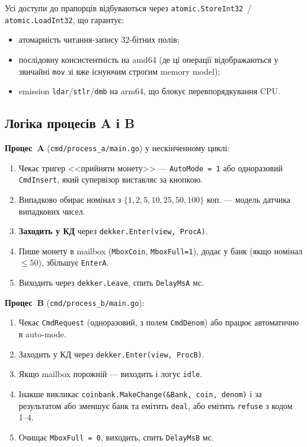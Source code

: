 \documentclass[a4paper,12pt]{article}
\begin{document}
Усі доступи до прапорців відбуваються через
\texttt{atomic.StoreInt32}~/ \texttt{atomic.LoadInt32}, що гарантує:
\begin{itemize}
    \item атомарність читання-запису 32-бітних полів;
    \item послідовну консистентність на amd64 (де ці операції
    відображаються у звичайні \texttt{mov} зі вже існуючим строгим
    memory model);
    \item emission \texttt{ldar}/\texttt{stlr}/\texttt{dmb} на arm64,
    що блокує перевпорядкування CPU.
\end{itemize}

\subsection{Логіка процесів A і B}

\textbf{Процес~A} (\texttt{cmd/process\_a/main.go}) у нескінченному
циклі:
\begin{enumerate}
    \item Чекає тригер <<прийняти монету>> --- \texttt{AutoMode = 1}
    або одноразовий \texttt{CmdInsert}, який супервізор виставляє за
    кнопкою.
    \item Випадково обирає номінал з $\{1, 2, 5, 10, 25, 50, 100\}$
    коп. --- модель датчика випадкових чисел.
    \item \textbf{Заходить у КД} через
    \texttt{dekker.Enter(view, ProcA)}.
    \item Пише монету в mailbox (\texttt{MboxCoin}, \texttt{MboxFull=1}),
    додає у банк (якщо номінал $\le 50$), збільшує \texttt{EnterA}.
    \item Виходить через \texttt{dekker.Leave}, спить \texttt{DelayMsA}
    мс.
\end{enumerate}

\textbf{Процес~B} (\texttt{cmd/process\_b/main.go}):
\begin{enumerate}
    \item Чекає \texttt{CmdRequest} (одноразовий, з полем
    \texttt{CmdDenom}) або працює автоматично в auto-mode.
    \item Заходить у КД через \texttt{dekker.Enter(view, ProcB)}.
    \item Якщо mailbox порожній --- виходить і логує \texttt{idle}.
    \item Інакше викликає
    \texttt{coinbank.MakeChange(\&Bank, coin, denom)} і за результатом
    або зменшує банк та емітить \texttt{deal}, або емітить
    \texttt{refuse} з кодом 1--4.
    \item Очищає \texttt{MboxFull = 0}, виходить, спить
    \texttt{DelayMsB} мс.
\end{enumerate}
\end{document}
